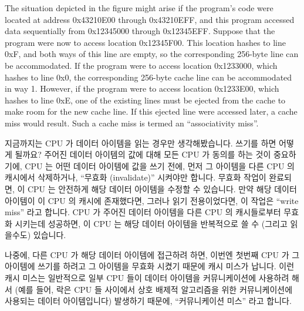 The situation depicted in the figure might arise if the program's code
were located at address 0x43210E00 through 0x43210EFF, and this program
accessed data sequentially from 0x12345000 through 0x12345EFF.
Suppose that the program were now to access location 0x12345F00.
This location hashes to line 0xF, and both ways of this line are
empty, so the corresponding 256-byte line can be accommodated.
If the program were to access location 0x1233000, which hashes to line
0x0, the corresponding 256-byte cache line can be accommodated in
way 1.
However, if the program were to access location 0x1233E00, which hashes
to line 0xE, one of the existing lines must be ejected from the cache
to make room for the new cache line.
If this ejected line were accessed later, a cache miss would result.
Such a cache miss is termed an ``associativity miss''.
\fi

지금까지는 CPU 가 데이터 아이템을 읽는 경우만 생각해봤습니다.
쓰기를 하면 어떻게 될까요?
주어진 데이터 아이템의 값에 대해 모든 CPU 가 동의를 하는 것이 중요하기에, CPU
는 어떤 데이터 아이템에 값을 쓰기 전에, 먼저 그 아이템을 다른 CPU 의 캐시에서
삭제하거나, ``무효화 (invalidate)'' 시켜야만 합니다.
무효화 작업이 완료되면, 이 CPU 는 안전하게 해당 데이터 아이템을 수정할 수
있습니다.
만약 해당 데이터 아이템이 이 CPU 의 캐시에 존재했다면, 그러나 읽기
전용이었다면, 이 작업은 ``write miss'' 라고 합니다.
CPU 가 주어진 데이터 아이템을 다른 CPU 의 캐시들로부터 무효화 시키는데
성공하면, 이 CPU 는 해당 데이터 아이템을 반복적으로 쓸 수 (그리고 읽을수도)
있습니다.

나중에, 다른 CPU 가 해당 데이터 아이템에 접근하려 하면, 이번엔 첫번째 CPU 가 그
아이템에 쓰기를 하려고 그 아이템을 무효화 시켰기 때문에 캐시 미스가 납니다.
이런 캐시 미스는 일반적으로 일부 CPU 들이 데이터 아이템을 커뮤니케이션에
사용하려 해서 (예를 들어, 락은 CPU 들 사이에서 상호 배제적 알고리즘을 위한
커뮤니케이션에 사용되는 데이터 아이템입니다) 발생하기 때문에, ``커뮤니케이션
미스'' 라고 합니다.

